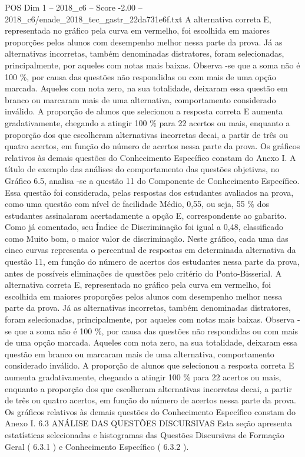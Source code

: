 \begin{textsample}{POS Dim 1 – 2018\_c6 – Score -2.00 – 2018\_c6/enade\_2018\_tec\_gastr\_22da731e6f.txt}
A alternativa correta E, representada no gráfico pela curva em vermelho, foi escolhida em maiores proporções pelos alunos com desempenho melhor nessa parte da prova.
Já as alternativas incorretas, também denominadas distratores, foram selecionadas, principalmente, por aqueles com notas mais baixas.
Observa -se que a soma não é 100 \%, por causa das questões não respondidas ou com mais de uma opção marcada.
Aqueles com nota zero, na sua totalidade, deixaram essa questão em branco ou marcaram mais de uma alternativa, comportamento considerado inválido.
A proporção de alunos que selecionou a resposta correta E aumenta gradativamente, chegando a atingir 100 \% para 22 acertos ou mais, enquanto a proporção dos que escolheram alternativas incorretas decai, a partir de três ou quatro acertos, em função do número de acertos nessa parte da prova.
Os gráficos relativos às demais questões do Conhecimento Específico constam do Anexo I.
A título de exemplo das análises do comportamento das questões objetivas, no Gráfico 6.5, analisa -se a questão 11 do Componente de Conhecimento Específico.
Essa questão foi considerada, pelas respostas dos estudantes avaliados na prova, como uma questão com nível de facilidade Médio, 0,55, ou seja, 55 \% dos estudantes assinalaram acertadamente a opção E, correspondente ao gabarito.
Como já comentado, seu Índice de Discriminação foi igual a 0,48, classificado como Muito bom, o maior valor de discriminação.
Neste gráfico, cada uma das cinco curvas representa o percentual de respostas em determinada alternativa da questão 11, em função do número de acertos dos estudantes nessa parte da prova, antes de possíveis eliminações de questões pelo critério do Ponto-Bisserial.
A alternativa correta E, representada no gráfico pela curva em vermelho, foi escolhida em maiores proporções pelos alunos com desempenho melhor nessa parte da prova.
Já as alternativas incorretas, também denominadas distratores, foram selecionadas, principalmente, por aqueles com notas mais baixas.
Observa -se que a soma não é 100 \%, por causa das questões não respondidas ou com mais de uma opção marcada.
Aqueles com nota zero, na sua totalidade, deixaram essa questão em branco ou marcaram mais de uma alternativa, comportamento considerado inválido.
A proporção de alunos que selecionou a resposta correta E aumenta gradativamente, chegando a atingir 100 \% para 22 acertos ou mais, enquanto a proporção dos que escolheram alternativas incorretas decai, a partir de três ou quatro acertos, em função do número de acertos nessa parte da prova.
Os gráficos relativos às demais questões do Conhecimento Específico constam do Anexo I. 6.3 ANÁLISE DAS QUESTÕES DISCURSIVAS Esta seção apresenta estatísticas selecionadas e histogramas das Questões Discursivas de Formação Geral ( 6.3.1 ) e Conhecimento Específico ( 6.3.2 ).

\end{textsample}
